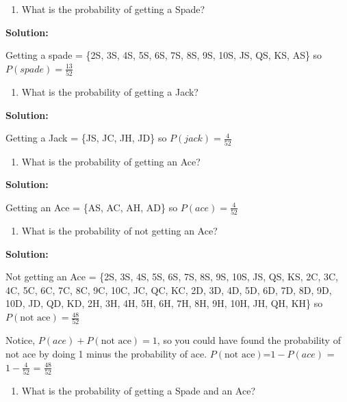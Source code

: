 \documentclass[
]{book}
\providecommand{\tightlist}{%
  \setlength{\itemsep}{0pt}\setlength{\parskip}{0pt}}
\begin{document}
\begin{enumerate}
\def\labelenumi{\alph{enumi}.}
\setcounter{enumi}{1}
\tightlist
\item
  What is the probability of getting a Spade?
\end{enumerate}

\textbf{Solution:}

Getting a spade = \{2S, 3S, 4S, 5S, 6S, 7S, 8S, 9S, 10S, JS, QS, KS, AS\} so \(P(spade)=\frac{13}{52}\)

\begin{enumerate}
\def\labelenumi{\alph{enumi}.}
\setcounter{enumi}{2}
\tightlist
\item
  What is the probability of getting a Jack?
\end{enumerate}

\textbf{Solution:}

Getting a Jack = \{JS, JC, JH, JD\} so \(P(jack)=\frac{4}{52}\)

\begin{enumerate}
\def\labelenumi{\alph{enumi}.}
\setcounter{enumi}{3}
\tightlist
\item
  What is the probability of getting an Ace?
\end{enumerate}

\textbf{Solution:}

Getting an Ace = \{AS, AC, AH, AD\} so \(P(ace)=\frac{4}{52}\)

\begin{enumerate}
\def\labelenumi{\alph{enumi}.}
\setcounter{enumi}{4}
\tightlist
\item
  What is the probability of not getting an Ace?
\end{enumerate}

\textbf{Solution:}

Not getting an Ace = \{2S, 3S, 4S, 5S, 6S, 7S, 8S, 9S, 10S, JS, QS, KS, 2C, 3C, 4C, 5C, 6C, 7C, 8C, 9C, 10C, JC, QC, KC, 2D, 3D, 4D, 5D, 6D, 7D, 8D, 9D, 10D, JD, QD, KD, 2H, 3H, 4H, 5H, 6H, 7H, 8H, 9H, 10H, JH, QH, KH\} so \(P(\text{not ace})=\frac{48}{52}\)

Notice, \(P(ace)+P(\text{not ace})=1\), so you could have found the probability of not ace by doing 1 minus the probability of ace. \(P(\text{not ace})\)=\(1-P(ace)\) = \(1-\frac{4}{52}\) = \(\frac{48}{52}\)

\begin{enumerate}
\def\labelenumi{\alph{enumi}.}
\setcounter{enumi}{5}
\tightlist
\item
  What is the probability of getting a Spade and an Ace?
\end{enumerate}
\end{document}
